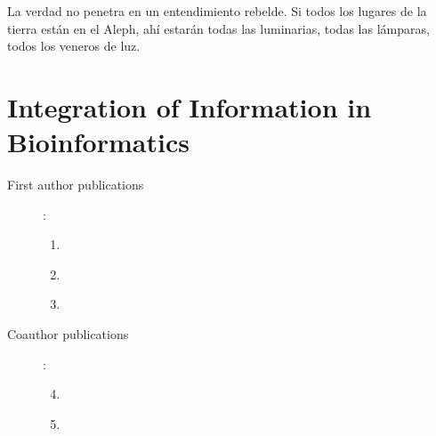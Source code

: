 \begin{savequote}[75mm] 
La verdad no penetra en un entendimiento rebelde. Si todos los lugares de la tierra est\'{a}n en el Aleph, ah\'{i} estar\'{a}n todas las luminarias, todas las l\'{a}mparas, todos los veneros de luz.
\end{savequote}

\chapter{Integration of Information in Bioinformatics} \label{section:integration}


\begin{description}
	\item[First author publications]:\\
		\begin{enumerate}
			\item \label{paper:mydas} 
			\item \label{paper:writeback}
			\item \label{paper:msctheses}
		\end{enumerate}
 	\item[Coauthor publications]:\\
		\begin{enumerate}
			\setcounter{enumi}{3}
			\item \label{paper:dasty3} 
			\item \label{paper:mykaryoview} 
		\end{enumerate}


\end{description}
